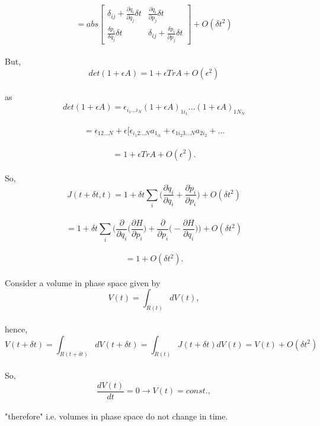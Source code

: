 \documentclass[12pt, letterpaper, oneside, article]{memoir}
\begin{document}
$$=abs\begin{bmatrix}
\delta_{ij}+\frac{\partial \dot{q}_i}{\partial q_j}\delta t&\frac{\partial \dot{q}_i}{\partial p_j}\delta t\\
\frac{\delta\dot{p}_i}{\delta q_j}\delta t&\delta_{ij}+\frac{\delta \dot{p}_i}{\partial p_j}\delta t
\end{bmatrix}+O(\delta t^2)
$$\\
But,\\
$$det(1+\epsilon A)=1+\epsilon TrA+O(\epsilon^2)$$\\
as\\
$$det(1+\epsilon A)=\epsilon_{i_1...i_N}(1+\epsilon A)_{1i_1}...(1+\epsilon A)_{1N_N}$$\\
$$=\epsilon_{12...N}+\epsilon [\epsilon_{{i_1}2...N}a_{{1_{i1}}}+\epsilon_{1i_{2}3...N}a_{2i_2}+...$$\\
$$=1+\epsilon TrA+O(\epsilon ^2).$$\\
So,\\
$$J(t+\delta t,t)=1+\delta t\sum_{i}\Big( \frac{\partial \dot{q}_i}{\partial q_i}+\frac{\partial \dot p_i}{\partial p_i}\Big) +O(\delta t^2)$$\\
$$=1+\delta t \sum_{i} \Big(\frac{\partial}{\partial q_i}\Big( \frac{\partial H}{\partial p_i}\Big)+\frac{\partial}{\partial p_i}\Big(-\frac{\partial H}{\partial q_i}\Big) \Big)+O(\delta t^2)$$\\
$$=1+O(\delta t^2).$$\\
Consider a volume in phase space given by\\
$$V(t)=\int_{R(t)}dV(t),$$\\
hence,\\
$$V(t+\delta t)=\int_{R(t+\delta t)} dV(t+\delta t)=\int_{R(t)} J(t+\delta t)dV(t)=V(t)+O(\delta t^2)$$\\
So,
$$\frac{dV(t)}{dt}=0\rightarrow V(t) = const.,$$\\
"therefore" i.e. volumes in phase space do not change in time.
 
\end{document}
